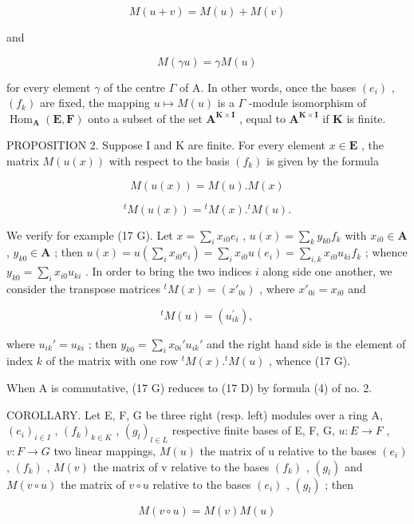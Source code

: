 \[
M (u + v) = M (u) + M (v)\tag{15}
\]

and

\[
M (\gamma u) = \gamma M (u)\tag{16}
\]

for every element \(\gamma\) of the centre \(\Gamma\) of A. In other words, once the bases \((e_i)\) , \((f_k)\) are fixed, the mapping \(u \mapsto M(u)\) is a \(\Gamma\) -module isomorphism of \(\operatorname{Hom}_{\mathbf{A}}(\mathbf{E}, \mathbf{F})\) onto a subset of the set \(\mathbf{A}^{\mathbf{K} \times \mathbf{I}}\) , equal to \(\mathbf{A}^{\mathbf{K} \times \mathbf{I}}\) if \(\mathbf{K}\) is finite.

PROPOSITION 2. Suppose I and K are finite. For every element \(x \in \mathbf{E}\) , the matrix \(M(u(x))\) with respect to the basis \((f_k)\) is given by the formula

\[
M (u (x)) = M (u). M (x)\tag{17 D}
\]

\[
{ } ^ { t } M ( u ( x ) ) = { } ^ { t } M ( x ) . { } ^ { t } M ( u ) .\tag{17 G}
\]

We verify for example (17 G). Let \(x = \sum_{i} x_{i0} e_i\) , \(u(x) = \sum_{k} y_{k0} f_k\) with \(x_{i0} \in \mathbf{A}\) , \(y_{k0} \in \mathbf{A}\) ; then \(u(x) = u\left(\sum_{i} x_{i0} e_i\right) = \sum_{i} x_{i0} u(e_i) = \sum_{i, k} x_{i0} u_{ki} f_k\) ; whence \(y_{k0} = \sum_{i} x_{i0} u_{ki}\) . In order to bring the two indices \(i\) along side one another, we consider the transpose matrices \(^t M(x) = (x'_{0i})\) , where \(x'_{0i} = x_{i0}\) and

\[
{ } ^ { t } M ( u ) = \left( u _ { i k } ^ { \prime } \right) ,
\]

where \(u_{ik}' = u_{ki}\) ; then \(y_{k0} = \sum_{i} x_{0i}' u_{ik}'\) and the right hand side is the element of index \(k\) of the matrix with one row \(^t M(x).^t M(u)\) , whence (17 G).

When A is commutative, (17 G) reduces to (17 D) by formula (4) of no. 2.

COROLLARY. Let E, F, G be three right (resp. left) modules over a ring A, \((e_{i})_{i\in I}\) , \((f_{k})_{k\in K}\) , \((g_{l})_{l\in L}\) respective finite bases of E, F, G, \(u:E\to F\) , \(v:F\to G\) two linear mappings, \(M(u)\) the matrix of u relative to the bases \((e_{i})\) , \((f_{k})\) , \(M(v)\) the matrix of v relative to the bases \((f_{k})\) , \((g_{l})\) and \(M(v\circ u)\) the matrix of \(v\circ u\) relative to the bases \((e_{i})\) , \((g_{l})\) ; then

\[
M (v \circ u) = M (v) M (u)\tag{18 D}
\]


